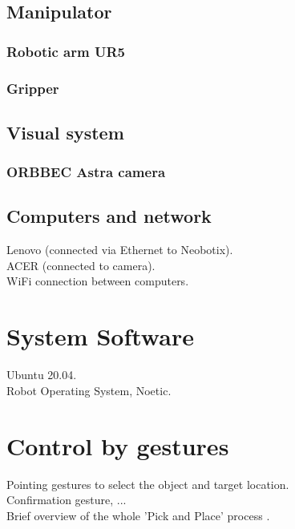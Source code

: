 \subsection{Manipulator}

\subsubsection{Robotic arm UR5}
\subsubsection{Gripper}

\subsection{Visual system}

\subsubsection{ORBBEC Astra camera}

\subsection{Computers and network}
Lenovo (connected via Ethernet to Neobotix).\\
ACER (connected to camera).\\

WiFi connection between computers.\\


\section{System Software}
Ubuntu 20.04.\\
Robot Operating System, Noetic.\\

\section{Control by gestures}
Pointing gestures to select the object and target location.\\
Confirmation gesture, ...\\
Brief overview of the whole 'Pick and Place' process .\\